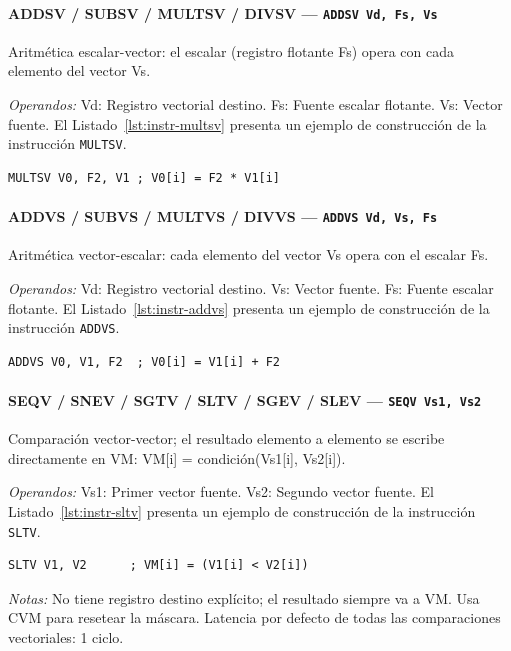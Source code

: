 \documentclass[../main.tex]{subfiles}
\begin{document}
\paragraph*{ADDSV / SUBSV / MULTSV / DIVSV --- \texttt{ADDSV Vd, Fs, Vs}}
Aritmética escalar-vector: el escalar (registro flotante Fs) opera con cada elemento del vector Vs.

\textit{Operandos:} Vd: Registro vectorial destino. Fs: Fuente escalar flotante. Vs: Vector fuente.
El Listado~\ref{lst:instr-multsv} presenta un ejemplo de construcción de la instrucción \texttt{MULTSV}.

\begin{lstlisting}[caption={MULTSV},label={lst:instr-multsv}]
	MULTSV V0, F2, V1 ; V0[i] = F2 * V1[i]
\end{lstlisting}

\paragraph*{ADDVS / SUBVS / MULTVS / DIVVS --- \texttt{ADDVS Vd, Vs, Fs}}
Aritmética vector-escalar: cada elemento del vector Vs opera con el escalar Fs.

\textit{Operandos:} Vd: Registro vectorial destino. Vs: Vector fuente. Fs: Fuente escalar flotante.
El Listado~\ref{lst:instr-addvs} presenta un ejemplo de construcción de la instrucción \texttt{ADDVS}.

\begin{lstlisting}[caption={ADDVS},label={lst:instr-addvs}]
	ADDVS V0, V1, F2  ; V0[i] = V1[i] + F2
\end{lstlisting}

\paragraph*{SEQV / SNEV / SGTV / SLTV / SGEV / SLEV --- \texttt{SEQV Vs1, Vs2}}
Comparación vector-vector; el resultado elemento a elemento se escribe directamente en VM: VM[i] = condición(Vs1[i], Vs2[i]).

\textit{Operandos:} Vs1: Primer vector fuente. Vs2: Segundo vector fuente.
El Listado~\ref{lst:instr-sltv} presenta un ejemplo de construcción de la instrucción \texttt{SLTV}.

\begin{lstlisting}[caption={SLTV},label={lst:instr-sltv}]
	SLTV V1, V2      ; VM[i] = (V1[i] < V2[i])
\end{lstlisting}
\textit{Notas:} No tiene registro destino explícito; el resultado siempre va a VM. Usa CVM para resetear la máscara. Latencia por defecto de todas las comparaciones vectoriales: 1 ciclo.
\end{document}
